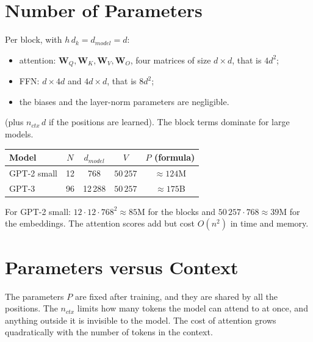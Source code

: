 \section{Number of Parameters}
Per block, with $h\,d_{k}=d_{model}=d$:
\begin{itemize}
    \item attention: $\bm{W}_{Q},\bm{W}_{K},\bm{W}_{V},\bm{W}_{O}$, four matrices of size
        $d\times d$, that is $4d^{2}$;
    \item FFN: $d\times 4d$ and $4d\times d$, that is $8d^{2}$;
    \item the biases and the layer-norm parameters are negligible.
\end{itemize}
\begin{center}
\end{center}
(plus $n_{ctx}\,d$ if the positions are learned). The block terms dominate for large
models.
\begin{center}
\begin{tabular}{|l|c|c|c|c|}
    \hline
    Model & $N$ & $d_{model}$ & $V$ & $P$ (formula)\\
    \hline
    GPT-2 small & 12 & 768 & $50\,257$ & $\approx 124$M\\
    GPT-3 & 96 & 12\,288 & $50\,257$ & $\approx 175$B\\
    \hline
\end{tabular}
\end{center}
For GPT-2 small: $12\cdot12\cdot768^{2}\approx85$M for the blocks and $50\,257\cdot768
\approx39$M for the embeddings. The attention scores add  but cost
$O(n^{2})$ in time and memory.

\section{Parameters versus Context}
The parameters $P$ are fixed after training, and they are shared by all the positions. The
 $n_{ctx}$ limits how many tokens the model can attend to at once, and
anything outside it is invisible to the model. The cost of attention grows quadratically
with the number of tokens in the context.
